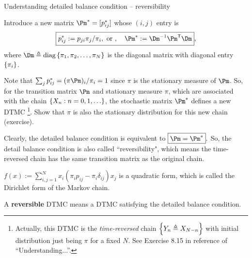 \documentclass[english,10pt]{beamer}
\begin{document}
\begin{frame}
{Understanding detailed balance condition -- reversibility }


 \bizp
 \item
   Introduce a new  matrix
 $\Pm^*=[p^*_{ij}]$ whose $(i,j)$ entry is 
 \[ \boxed{p^*_{ij}:= p_{ji}\pi_j / \pi_i,  \mbox { or }, ~~~\Pm^*:= \Dm^{-1}\Pm^\tr \Dm},\]
 where   $\Dm\triangleq \mbox{diag}\set{\pi_1,\pi_2,\ldots,\pi_N}$  is the diagonal matrix
 with   diagonal entry  $\left\{\pi_i\right\}$.
 
 \item
 Note that $\sum_j p^*_{ij}=  (\pi  \Pm)_i / \pi_i=1$ since $\pi$ is the stationary measure of $\Pm$.
 So, for the transition matrix $\Pm$ and stationary  measure $\pi$, which are 
 associated with the chain $\left\{X_n:n=0,1,\ldots\right\}$, the 
 stochastic matrix $\Pm^*$ defines a new DTMC
 \footnote{Actually, this DTMC is the {\it time-reversed} chain $\left\{Y_n\triangleq X_{N-n}\right\}$
 with initial distribution just being $\pi$ for a fixed $N$. See Exercise 8.15 in reference of ``Understanding...''.}.
Show  that $\pi$ is also the stationary distribution for this new  chain (exercise).
  
\item 
 Clearly, the detailed balance condition is equivalent to   
 $ \boxed{\Pm =\Pm^*}.$
So,  the detail balance condition is also called ``reversibility", 
which means the time-reversed chain has the same transition matrix as the original chain.

\item 

$f(x):=\sum_{i,j=1}^N x_i ( \pi_i  p_{ij}-\pi_i \delta_{ij})x_j$
is a quadratic form, which is called the {Dirichlet form} 
of the Markov chain.
\eiz 

\begin{definition}
A {\bf reversible } DTMC means a DTMC satisfying the detailed balance condition.
\end{definition}



  
 \end{frame}
 
\end{document}
